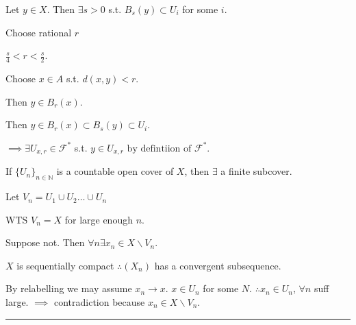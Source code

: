 \documentclass[twoside]{article}
\newcommand{\N}{\mathbb{N}}
\newenvironment{proof}{{\bf Proof:}}{\hfill\rule{2mm}{2mm}}
\begin{document}
\begin{proof}
    Let $y \in X$. Then $\exists s > 0$ s.t. $B_s(y) \subset U_i$ for some $i$. 

    Choose rational $r$

    $\frac s4 < r < \frac s2$.

    Choose $x \in A$ s.t. $d(x,y) < r$. 

    Then $y \in B_r(x)$. 

    Then $ y \in B_r(x) \subset B_s(y) \subset U_i$. 

    $\implies \exists U_{x,r} \in \mathcal{F^*} $ s.t. $y \in U_{x,r} \text{ by defintiion of } \mathcal{F^*}$. 

    If $\{U_n\}_{n \in \N}$ is a countable open cover of $X$, then $\exists $ a finite subcover. 

    Let $V_n = {U_1 \cup U_2 \dots \cup U_n}$

    WTS $V_n = X$ for large enough $n$. 

    Suppose not. Then $\forall n \exists x_n \in X \backslash V_n$. 

    $X$ is sequentially compact $\therefore (X_n)$ has a convergent subsequence. 

    By relabelling we may assume $x_n \rightarrow x$. $x \in U_n$ for some $N$. $\therefore x_n \in U_n$, $\forall n$ suff large. $\implies $ contradiction because $x_n \in X \backslash V_n$. 

\end{proof}
\end{document}
